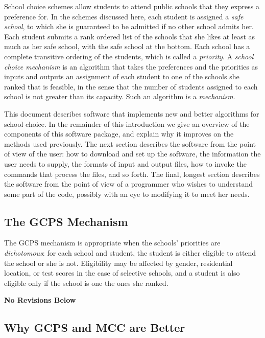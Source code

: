 \documentclass[12pt]{article}
\theoremstyle{definition}
\newcommand{\norev}{\medskip \centerline{\textbf{No Revisions Below}} \medskip}
\begin{document}
School choice schemes allow students to attend public schools that
they express a preference for.  In the schemes discussed here, each
student is assigned a \emph{safe school}, to which she is guaranteed
to be admitted if no other school admits her.  Each student submits a
rank ordered list of the schools that she likes at least as much as
her safe school, with the safe school at the bottom.  Each school has
a complete transitive ordering of the students, which is called a
\emph{priority}.  A \emph{school choice mechanism} is an algorithm
that takes the preferences and the priorities as inputs and outputs an
assignment of each student to one of the schools she ranked that is
feasible, in the sense that the number of students assigned to each
school is not greater than its capacity.  Such an algorithm is a
\emph{mechanism}.

This document describes software that implements new and better
algorithms for school choice.  In the remainder of this introduction
we give an overview of the components of this software package, and
explain why it improves on the methods used previously.  The next
section describes the software from the point of view of the user: how
to download and set up the software, the information the user needs to
supply, the formats of input and output files, how to invoke the
commands that process the files, and so forth.  The final, longest
section describes the software from the point of view of a programmer
who wishes to understand some part of the code, possibly with an eye to
modifying it to meet her needs.

\subsection{The GCPS Mechanism}

The GCPS mechanism is appropriate when the schools' priorities are
\emph{dichotomous}: for each school and student, the student is either
eligible to attend the school or she is not.  Eligibility may be
affected by gender, residential location, or test scores in the case
of selective schools, and a student is also eligible only if the school
is one the ones she ranked.

\norev

\subsection{Why GCPS and MCC are Better}
\end{document}

